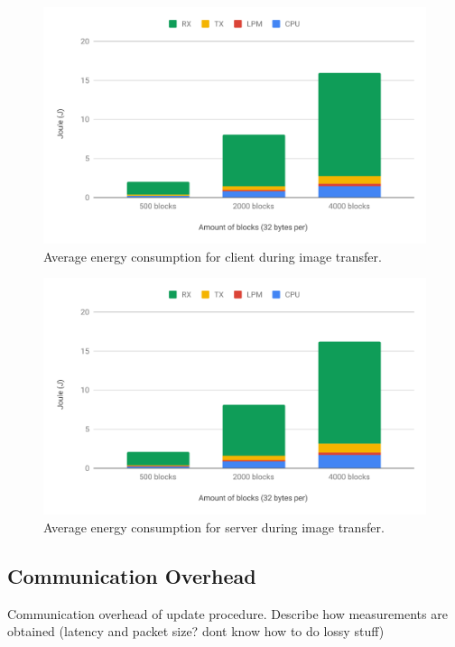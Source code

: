 \documentclass[0-thesis.tex]{subfiles}
\begin{document}
\begin{figure}
    \caption{Average energy consumption for client during image transfer.}
    \label{fig:client-image-energy}
    \includegraphics[scale=0.8]{images/client-image-energy.pdf}
\end{figure}

\begin{figure}
    \caption{Average energy consumption for server during image transfer.}
    \label{fig:server-image-energy}
    \includegraphics[scale=0.8]{images/server-image-energy.pdf}
\end{figure}

\subsection{Communication Overhead}
\label{ssec:communication-overhead}
Communication overhead of update procedure.
Describe how measurements are obtained (latency and packet size? dont know how to do lossy
stuff)
\end{document}
